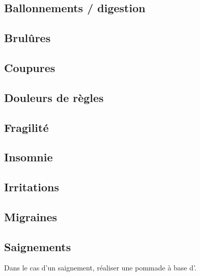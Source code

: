 

\subsection{Ballonnements / digestion}
    

\subsection{Brulûres}
    


\subsection{Coupures}
    

\subsection{Douleurs de règles}

\subsection{Fragilité}
    

\subsection{Insomnie}
    
\subsection{Irritations}
    

    

\subsection{Migraines}


\subsection{Saignements}

Dans le cas d'un saignement, réaliser une pommade à base d'. \\
